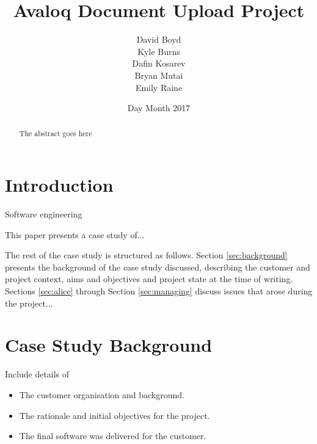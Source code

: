 \documentclass{l3proj}
\begin{document}
\title{Avaloq Document Upload Project}

\author{David Boyd \\
        Kyle Burns \\
        Dafin Kosarev \\
        Bryan Mutai \\
        Emily Raine}

\date{Day Month 2017}

\maketitle

\begin{abstract}

The abstract goes here

\end{abstract}

\educationalconsent

\newpage

\section{Introduction}

Software engineering 

This paper presents a case study of... 


The rest of the case study is structured as follows.  Section
\ref{sec:background} presents the background of the case study
discussed, describing the customer and project context, aims and
objectives and project state at the time of writing.  Sections
\ref{sec:alice} through Section \ref{sec:managing} discuss issues that
arose during the project...

\section{Case Study Background}

Include details of 

\begin{itemize}
\item The customer organisation and background.
\item The rationale and initial objectives for the project.
\item The final software was delivered for the customer.
\end{itemize}
\end{document}
